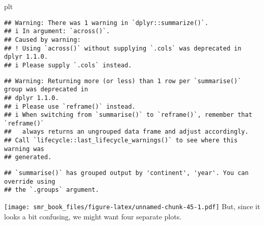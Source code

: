 \documentclass[
  oneside]{book}
\newenvironment{Shaded}{\begin{snugshade}}{\end{snugshade}}
\newcommand{\NormalTok}[1]{#1}
\begin{document}
\begin{Shaded}
\begin{Highlighting}[]
\NormalTok{plt}
\end{Highlighting}
\end{Shaded}

\begin{verbatim}
## Warning: There was 1 warning in `dplyr::summarize()`.
## i In argument: `across()`.
## Caused by warning:
## ! Using `across()` without supplying `.cols` was deprecated in dplyr 1.1.0.
## i Please supply `.cols` instead.
\end{verbatim}

\begin{verbatim}
## Warning: Returning more (or less) than 1 row per `summarise()` group was deprecated in
## dplyr 1.1.0.
## i Please use `reframe()` instead.
## i When switching from `summarise()` to `reframe()`, remember that `reframe()`
##   always returns an ungrouped data frame and adjust accordingly.
## Call `lifecycle::last_lifecycle_warnings()` to see where this warning was
## generated.
\end{verbatim}

\begin{verbatim}
## `summarise()` has grouped output by 'continent', 'year'. You can override using
## the `.groups` argument.
\end{verbatim}

\texttt{[image: smr\_book\_files/figure-latex/unnamed-chunk-45-1.pdf]}
But, since it looks a bit confusing, we might want four separate plots.
\end{document}
